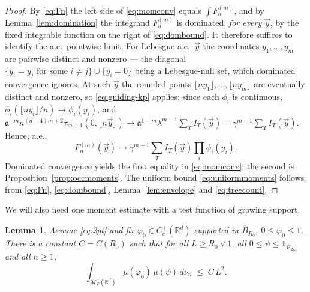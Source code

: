 \documentclass[11pt]{article}
\newtheorem{lemma}[theorem]{Lemma}
\theoremstyle{definition}
\theoremstyle{remark}
\newcommand{\R}{\mathbb{R}}
\newcommand{\cM}{{\mathcal{M}_F(\R^d)}}          %
\newcommand{\Cc}{C_c^+(\R^d)}
\newcommand{\fl}[1]{\lfloor #1\rfloor}
\numberwithin{equation}{section}
\theoremstyle{plain}
\theoremstyle{definition}
\theoremstyle{remark}
\theoremstyle{plain}
\begin{document}
\begin{proof}
By \eqref{eq:Fn} the left side of \eqref{eq:momconv} equals
$\int F^{(m)}_n$, and by Lemma~\ref{lem:domination} the integrand
$F^{(m)}_n$ is dominated, \emph{for every} $\vec y$, by the fixed integrable
function on the right of \eqref{eq:dombound}. It therefore suffices to
identify the a.e.\ pointwise limit. For Lebesgue-a.e.\ $\vec y$ the
coordinates $y_1,\dots,y_m$ are pairwise distinct and nonzero --- the diagonal
$\{y_i=y_j \text{ for some } i\neq j\}\cup\{y_i=0\}$ being a Lebesgue-null
set, which dominated convergence ignores. At such $\vec y$ the rounded points
$\fl{ny_1},\dots,\fl{ny_m}$ are eventually distinct and nonzero, so
\eqref{eq:guiding-kp} applies; since each $\phi_i$ is continuous,
$\phi_i(\fl{ny_i}/n)\to\phi_i(y_i)$, and
$\mathfrak a^{-m}n^{(d-4)m+2}\tau_{m+1}(0,\fl{n\vec y})\to
\mathfrak a^{1-m}\lambda^{m-1}\sum_TI_T(\vec y)
=\gamma^{m-1}\sum_TI_T(\vec y)$. Hence, a.e., 
\[F^{(m)}_n(\vec y)\to\gamma^{m-1}\sum_TI_T(\vec y)\prod_i\phi_i(y_i).\]
Dominated convergence yields the first
equality in \eqref{eq:momconv}; the second is
Proposition~\ref{prop:occmoments}. The uniform bound
\eqref{eq:uniformmoments} follows from \eqref{eq:Fn}, \eqref{eq:dombound},
Lemma~\ref{lem:envelope} and \eqref{eq:treecount}.
\end{proof}

We will also need one moment estimate with a test function of growing
support.

\begin{lemma}\label{lem:growingsupport}
Assume \eqref{eq:2pt} and fix $\varphi_0\in\Cc$ supported in
$\overline B_{R_0}$, $0\le\varphi_0\le1$. There is a constant $C=C(R_0)$ such that for all $L\ge R_0\vee 1$, all
$0\le\psi\le\mathbf 1_{\overline B_{2L}}$ and all $n\ge1$,
\[
\int_\cM \mu(\varphi_0)\,\mu(\psi)\,d\nu_n\;\le\;C\,L^2 .
\]
\end{lemma}
\end{document}
